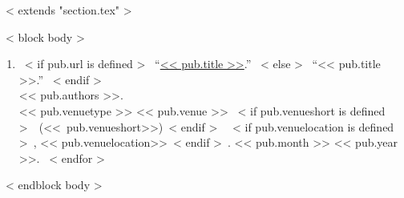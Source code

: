 ~< extends "section.tex" >~

~< block body >~
  \begin{enumerate}
    \itemsep 1em
    ~< for pub in items >~
      \item{
        ~< if pub.url is defined >~
          ``\href{<< pub.url >>}{<< pub.title >>}.''
        ~< else >~
          ``<< pub.title >>.''
        ~< endif >~\\
        << pub.authors >>.\\
        << pub.venuetype >>
        << pub.venue >>%
        ~< if pub.venueshort is defined >~\ \mbox{(<< pub.venueshort>>)}~< endif >~%
        ~< if pub.venuelocation is defined >~, << pub.venuelocation>>~< endif >~.
        << pub.month >>
        << pub.year >>.
      }
    ~< endfor >~
  \end{enumerate}
~< endblock body >~
